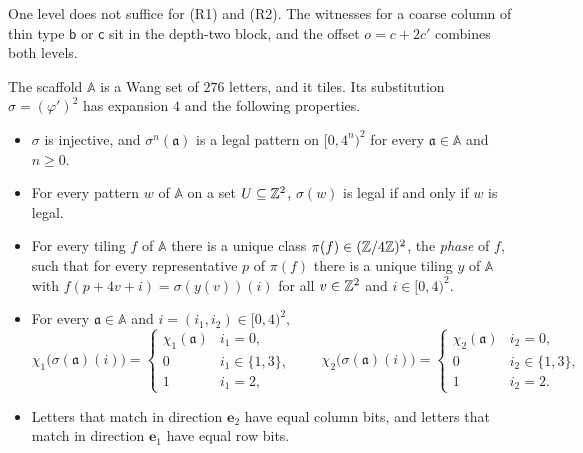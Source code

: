 One level does not suffice for (R1) and (R2). The witnesses for a coarse column of thin type $\mathsf b$ or $\mathsf c$ sit in the depth-two block, and the offset $o=c+2c'$ combines both levels.

\begin{proposition}\label{prop:scaffold}
The scaffold $\mathbb A$ is a Wang set of $276$ letters, and it tiles. Its substitution $\sigma=(\varphi')^2$ has expansion $4$ and the following properties.
\begin{itemize}
\item[(i)] $\sigma$ is injective, and $\sigma^n(\mathfrak a)$ is a legal pattern on $[0,4^n)^2$ for every $\mathfrak a\in\mathbb A$ and $n\ge0$.
\item[(ii)] For every pattern $w$ of $\mathbb A$ on a set $U\subseteq\mathbb{Z}^2$, $\sigma(w)$ is legal if and only if $w$ is legal.
\item[(iii)] For every tiling $f$ of $\mathbb A$ there is a unique class $\pi(f)\in(\mathbb{Z}/4\mathbb{Z})^2$, the \emph{phase} of $f$, such that for every representative $p$ of $\pi(f)$ there is a unique tiling $y$ of $\mathbb A$ with $f(p+4v+i)=\sigma(y(v))(i)$ for all $v\in\mathbb{Z}^2$ and $i\in[0,4)^2$.
\item[(iv)] For every $\mathfrak a\in\mathbb A$ and $i=(i_1,i_2)\in[0,4)^2$,
\[
\chi_1\bigl(\sigma(\mathfrak a)(i)\bigr)=\begin{cases}\chi_1(\mathfrak a)&i_1=0,\\0&i_1\in\{1,3\},\\1&i_1=2,\end{cases}\qquad
\chi_2\bigl(\sigma(\mathfrak a)(i)\bigr)=\begin{cases}\chi_2(\mathfrak a)&i_2=0,\\0&i_2\in\{1,3\},\\1&i_2=2.\end{cases}
\]
\item[(v)] Letters that match in direction $\mathbf e_2$ have equal column bits, and letters that match in direction $\mathbf e_1$ have equal row bits.
\end{itemize}
\end{proposition}


